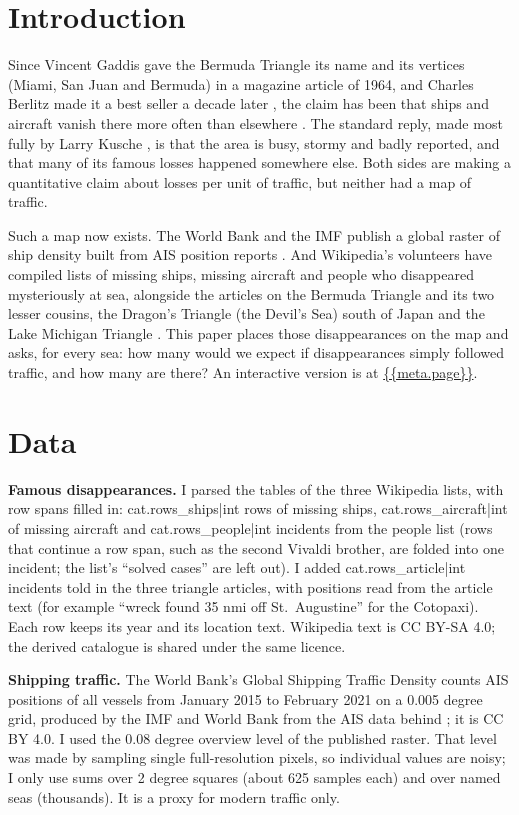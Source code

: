 \documentclass[11pt,a4paper]{article}
\begin{document}
\section{Introduction}
Since Vincent Gaddis gave the Bermuda Triangle its name and its vertices (Miami, San Juan and Bermuda) in a magazine article of 1964, and Charles Berlitz made it a best seller a decade later \citep{berlitz}, the claim has been that ships and aircraft vanish there more often than elsewhere \citep{wikibt}. The standard reply, made most fully by Larry Kusche \citep{kusche}, is that the area is busy, stormy and badly reported, and that many of its famous losses happened somewhere else. Both sides are making a quantitative claim about losses per unit of traffic, but neither had a map of traffic.

Such a map now exists. The World Bank and the IMF publish a global raster of ship density built from AIS position reports \citep{wbdensity,cerdeiro}. And Wikipedia's volunteers have compiled lists of missing ships, missing aircraft and people who disappeared mysteriously at sea, alongside the articles on the Bermuda Triangle and its two lesser cousins, the Dragon's Triangle (the Devil's Sea) south of Japan and the Lake Michigan Triangle \citep{wikimships,wikimair,wikipeople,wikids,wikilm}. This paper places those disappearances on the map and asks, for every sea: how many would we expect if disappearances simply followed traffic, and how many are there? An interactive version is at \url{{{meta.page}}}.

\section{Data}
\textbf{Famous disappearances.} I parsed the tables of the three Wikipedia lists, with row spans filled in: {{cat.rows_ships|int}} rows of missing ships, {{cat.rows_aircraft|int}} of missing aircraft and {{cat.rows_people|int}} incidents from the people list (rows that continue a row span, such as the second Vivaldi brother, are folded into one incident; the list's ``solved cases'' are left out). I added {{cat.rows_article|int}} incidents told in the three triangle articles, with positions read from the article text (for example ``wreck found 35 nmi off St.~Augustine'' for the Cotopaxi). Each row keeps its year and its location text. Wikipedia text is CC BY-SA 4.0; the derived catalogue is shared under the same licence.

\textbf{Shipping traffic.} The World Bank's Global Shipping Traffic Density \citep{wbdensity} counts AIS positions of all vessels from January 2015 to February 2021 on a 0.005 degree grid, produced by the IMF and World Bank from the AIS data behind \citet{cerdeiro}; it is CC BY 4.0. I used the 0.08 degree overview level of the published raster. That level was made by sampling single full-resolution pixels, so individual values are noisy; I only use sums over 2 degree squares (about 625 samples each) and over named seas (thousands). It is a proxy for modern traffic only.
\end{document}
